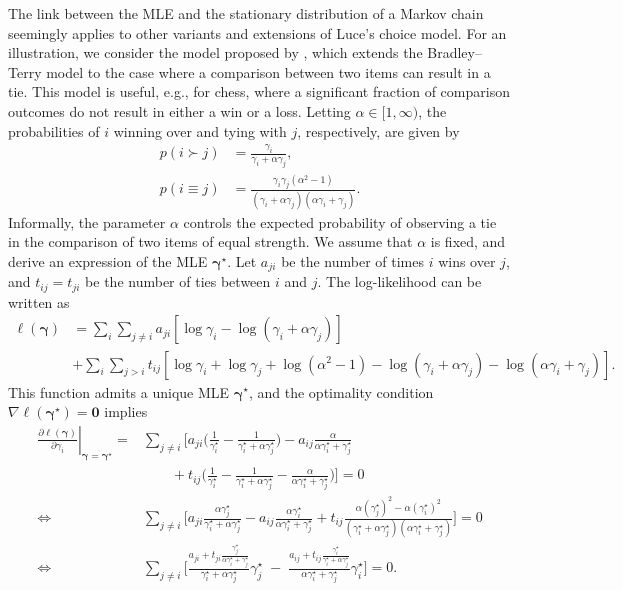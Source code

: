 The link between the MLE and the stationary distribution of a Markov chain seemingly applies to other variants and extensions of Luce's choice model.
For an illustration, we consider the model proposed by \citet{rao1967ties}, which extends the Bradley--Terry model to the case where a comparison between two items can result in a tie.
This model is useful, e.g., for chess, where a significant fraction of comparison outcomes do not result in either a win or a loss.
Letting $\alpha \in [1, \infty)$, the probabilities of $i$ winning over and tying with $j$, respectively, are given by
\begin{align*}
p(i \succ j) &= \frac{\gamma_i}{\gamma_i + \alpha \gamma_j}, \\
p(i \equiv j) &= \frac{\gamma_i \gamma_j(\alpha^2 - 1)}{(\gamma_i + \alpha\gamma_j)(\alpha \gamma_i + \gamma_j)}.
\end{align*}
Informally, the parameter $\alpha$ controls the expected probability of observing a tie in the comparison of two items of equal strength.
We assume that $\alpha$ is fixed, and derive an expression of the MLE $\bm{\gamma}^\star$.
Let $a_{ji}$ be the number of times $i$ wins over $j$, and $t_{ij} = t_{ji}$ be the number of ties between $i$ and $j$.
The log-likelihood can be written as
\begin{align*}
\ell(\bm{\gamma}) &=
  \sum_i \sum_{j \ne i}
  a_{ji} \left[ \log \gamma_i - \log(\gamma_i + \alpha \gamma_j) \right] \\
    &+ \sum_i \sum_{j > i}
    t_{ij} \left[ \log \gamma_i + \log \gamma_j  + \log(\alpha^2 - 1)
     - \log(\gamma_i + \alpha \gamma_j) - \log(\alpha \gamma_i + \gamma_j) \right].
\end{align*}
This function admits a unique MLE $\bm{\gamma}^\star$, and the optimality condition $\nabla \ell(\bm{\gamma}^\star) = \bm{0}$ implies
\begin{align*}
\left. \frac{\partial \ell(\bm{\gamma})}{\partial \gamma_i} \right\rvert_{\bm{\gamma}= \bm{\gamma}^\star}
    = &\sum_{j \ne i} \Bigg[ a_{ji} \bigg( \frac{1}{\gamma^\star_i} - \frac{1}{\gamma^\star_i + \alpha \gamma^\star_j} \bigg)
      - a_{ij} \frac{\alpha}{\alpha \gamma^\star_i + \gamma^\star_j} \\
      & \qquad {} + t_{ij} \bigg( \frac{1}{\gamma^\star_i} - \frac{1}{\gamma^\star_i + \alpha \gamma^\star_j} - \frac{\alpha}{\alpha \gamma^\star_i + \gamma^\star_j} \bigg) \Bigg] = 0 \\
    \iff & \sum_{j \ne i} \Bigg[ a_{ji} \frac{\alpha \gamma^\star_j}{\gamma^\star_i + \alpha \gamma^\star_j}
      - a_{ij} \frac{\alpha \gamma^\star_i}{\alpha \gamma^\star_i + \gamma^\star_j}
      + t_{ij} \frac{\alpha (\gamma^\star_j)^2 - \alpha (\gamma^\star_i)^2}{(\gamma^\star_i + \alpha \gamma^\star_j)(\alpha \gamma^\star_i + \gamma^\star_j)} \Bigg] = 0 \\
    \iff & \sum_{j \ne i} \Bigg[ \frac{a_{ji} + t_{ji}\tfrac{\gamma^\star_j}{\alpha \gamma^\star_i + \gamma^\star_j}}{\gamma^\star_i + \alpha \gamma^\star_j} \gamma^\star_j
      \; - \; \frac{a_{ij} + t_{ij}\tfrac{\gamma^\star_i}{\gamma^\star_i + \alpha \gamma^\star_j}}{\alpha \gamma^\star_i + \gamma^\star_j} \gamma^\star_i \Bigg] = 0.
\end{align*}
